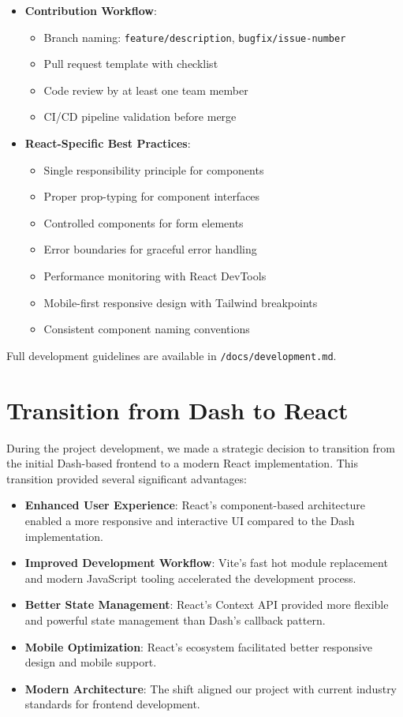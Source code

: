 \documentclass[12pt]{article}
\begin{document}
\begin{itemize}
    \item \textbf{Contribution Workflow}:
    \begin{itemize}
        \item Branch naming: \texttt{feature/description}, \texttt{bugfix/issue-number}
        \item Pull request template with checklist
        \item Code review by at least one team member
        \item CI/CD pipeline validation before merge
    \end{itemize}
    
    \item \textbf{React-Specific Best Practices}:
    \begin{itemize}
        \item Single responsibility principle for components
        \item Proper prop-typing for component interfaces
        \item Controlled components for form elements
        \item Error boundaries for graceful error handling
        \item Performance monitoring with React DevTools
        \item Mobile-first responsive design with Tailwind breakpoints
        \item Consistent component naming conventions
    \end{itemize}
\end{itemize}

Full development guidelines are available in \texttt{/docs/development.md}.

\section{Transition from Dash to React}

During the project development, we made a strategic decision to transition from the initial Dash-based frontend to a modern React implementation. This transition provided several significant advantages:

\begin{itemize}
    \item \textbf{Enhanced User Experience}: React's component-based architecture enabled a more responsive and interactive UI compared to the Dash implementation.
    \item \textbf{Improved Development Workflow}: Vite's fast hot module replacement and modern JavaScript tooling accelerated the development process.
    \item \textbf{Better State Management}: React's Context API provided more flexible and powerful state management than Dash's callback pattern.
    \item \textbf{Mobile Optimization}: React's ecosystem facilitated better responsive design and mobile support.
    \item \textbf{Modern Architecture}: The shift aligned our project with current industry standards for frontend development.
\end{itemize}
\end{document}
